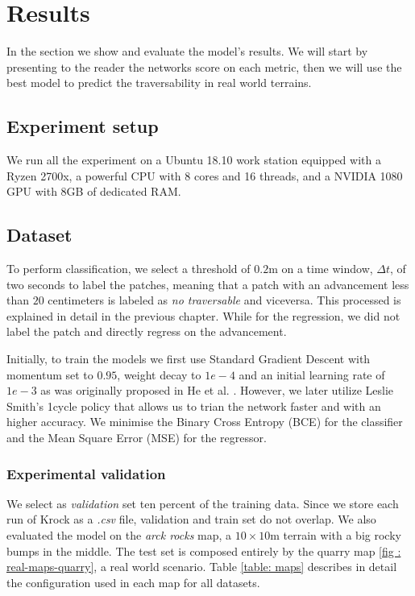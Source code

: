 \documentclass[../document.tex]{subfiles}
\begin{document}
\chapter{Results}
\label{chap: results}
In the section we show and evaluate the model's results. We will start by presenting to the reader the networks score on each metric, then we will use the best model to predict the traversability in real world terrains. 
\section{Experiment setup}
We run all the experiment on a Ubuntu 18.10  work station equipped with a Ryzen 2700x, a powerful CPU with 8 cores and 16 threads, and a NVIDIA 1080 GPU with 8GB of dedicated RAM.
\section{Dataset}
To perform classification, we select a threshold of $0.2$m on a time window, $\Delta t$, of two seconds to label the patches, meaning that a patch with an advancement less than $20$ centimeters is labeled as \emph{no traversable} and viceversa. This processed is explained in detail in the previous chapter. While for the regression, we did not label the patch and directly regress on the advancement.

Initially, to train the models we first use Standard Gradient Descent with momentum set to $0.95$, weight decay to $1e-4$ and an initial learning rate of $1e-3$ as was originally proposed in He et al. \cite{he2015deep}. However, we later utilize Leslie Smith's 1cycle policy \cite{1cycle} that allows us to trian the network faster and with an higher accuracy. We minimise the Binary Cross Entropy (BCE) for the classifier and the  Mean Square Error (MSE) for the regressor.
\subsection{Experimental validation}
We select as \emph{validation} set ten percent of the training data. Since we store each run of Krock as a \emph{.csv} file, validation and train set do not overlap. We also evaluated the model on the \emph{arck rocks} map, a $10\times10$m terrain with a big rocky bumps in the middle.
The test set is composed entirely by the quarry map \ref{fig : real-maps-quarry}, a real world scenario. Table \ref{table: maps} describes in detail the configuration used in each map for all datasets.
\end{document}
